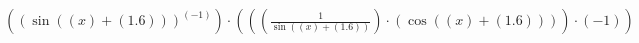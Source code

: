 \documentclass{article}
\begin{document}
$((\sin{((x) + (1.6))})^{(-1)})\cdot(((\frac{1}{\sin{((x) + (1.6))}})\cdot(\cos{((x) + (1.6))}))\cdot(-1))$
\end{document}
